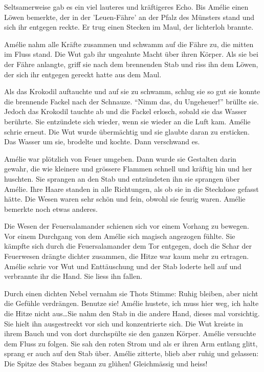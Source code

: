 \documentclass[11pt,titlepage,a5paper]{book}
\begin{document}
Seltsamerweise gab es ein viel lauteres und kräftigeres Echo. Bis Amélie einen Löwen bemerkte, der in der 'Leuen-Fähre' an der Pfalz des Münsters stand und sich ihr entgegen reckte. Er trug einen Stecken im Maul, der lichterloh brannte.

Amélie nahm alle Kräfte zusammen und schwamm auf die Fähre zu, die mitten im Fluss stand. Die Wut gab ihr ungeahnte Macht über ihren Körper. Als sie bei der Fähre anlangte, griff sie nach dem brennenden Stab und riss ihn dem Löwen, der sich ihr entgegen gereckt hatte aus dem Maul.

Als das Krokodil auftauchte und auf sie zu schwamm, schlug sie so gut sie konnte die brennende Fackel nach der Schnauze. "`Nimm das, du Ungeheuer!"' brüllte sie. Jedoch das Krokodil tauchte ab und die Fackel erlosch, sobald sie das Wasser berührte. Sie entzündete sich wieder, wenn sie wieder an die Luft kam. Amélie schrie erneut. Die Wut wurde übermächtig und sie glaubte daran zu ersticken. Das Wasser um sie, brodelte und kochte. Dann  verschwand es.

Amélie war plötzlich von Feuer umgeben. Dann wurde sie Gestalten darin gewahr, die wie kleinere und grössere Flammen schnell und kräftig hin und her huschten. Sie sprangen an den Stab und entzündeten ihn sie sprangen über Amélie. Ihre Haare standen in alle Richtungen, als ob sie in die Steckdose gefasst hätte. Die Wesen waren sehr schön und fein, obwohl sie feurig waren. Amélie bemerkte noch etwas anderes.

Die Wesen der Feuersalamander schienen sich vor einem Vorhang zu bewegen. Vor einem Durchgang von dem Amélie sich magisch angezogen fühlte. Sie kämpfte sich durch die Feuersalamander dem Tor entgegen, doch die Schar der Feuerwesen drängte dichter zusammen, die Hitze war kaum mehr zu ertragen. Amélie schrie vor Wut und Enttäuschung und der Stab loderte hell auf und verbrannte ihr die Hand. Sie liess ihn fallen.

Durch einen dichten Nebel vernahm sie Thots Stimme: Ruhig bleiben, aber nicht die Gefühle verdrängen. Benutze sie! Amélie hustete, ich muss hier weg, ich halte die Hitze nicht aus\dots Sie nahm den Stab in die andere Hand, dieses mal vorsichtig. Sie hielt ihn ausgestreckt vor sich und konzentrierte sich. Die Wut kreiste in ihrem Bauch und von dort durchspülte sie den ganzen Körper. Amélie versuchte dem Fluss zu folgen. Sie sah den roten Strom und als er ihren Arm entlang glitt, sprang er auch auf den Stab über. Amélie zitterte, blieb aber ruhig und gelassen: Die Spitze des Stabes begann zu glühen! Gleichmässig und heiss!
\end{document}
